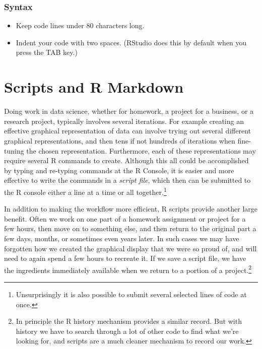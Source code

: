 \documentclass[]{krantz}
\providecommand{\tightlist}{%
  \setlength{\itemsep}{0pt}\setlength{\parskip}{0pt}}
\begin{document}
\subsection{Syntax}\label{syntax}

\begin{itemize}
\tightlist
\item
  Keep code lines under 80 characters long.
\item
  Indent your code with two spaces. (RStudio does this by default when
  you press the TAB key.)
\end{itemize}

\chapter{Scripts and R Markdown}\label{scripts-and-r-markdown}

Doing work in data science, whether for homework, a project for a
business, or a research project, typically involves several iterations.
For example creating an effective graphical representation of data can
involve trying out several different graphical representations, and then
tens if not hundreds of iterations when fine-tuning the chosen
representation. Furthermore, each of these representations may require
several R commands to create. Although this all could be accomplished by
typing and re-typing commands at the R Console, it is easier and more
effective to write the commands in a \emph{script file}, which then can
be submitted to the R console either a line at a time or all
together.\footnote{Unsurprisingly it is also possible to submit several
  selected lines of code at once.}

In addition to making the workflow more efficient, R scripts provide
another large benefit. Often we work on one part of a homework
assignment or project for a few hours, then move on to something else,
and then return to the original part a few days, months, or sometimes
even years later. In such cases we may have forgotten how we created the
graphical display that we were so proud of, and will need to again spend
a few hours to recreate it. If we save a script file, we have the
ingredients immediately available when we return to a portion of a
project.\footnote{In principle the R history mechanism provides a
  similar record. But with history we have to search through a lot of
  other code to find what we're looking for, and scripts are a much
  cleaner mechanism to record our work.}
\end{document}
